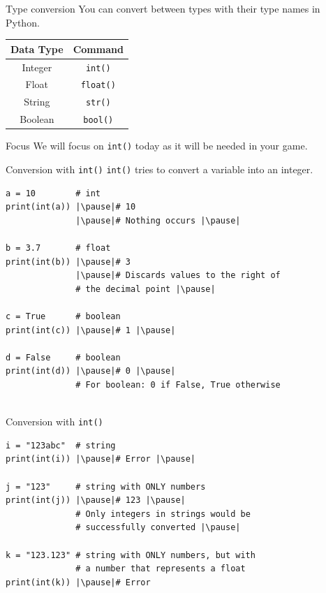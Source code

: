\documentclass[dvipsnames, svgnames, x11names, handout]{beamer}
\begin{document}
\begin{frame}{Type conversion}
You can convert between types with their type names in Python.
\begin{center}
	\begin{tabular}{|c|c|}\hline
		Data Type & Command\\\hline
		Integer & \texttt{int()}\\\hline
		Float & \texttt{float()}\\\hline
		String & \texttt{str()}\\\hline
		Boolean & \texttt{bool()}\\\hline
	\end{tabular}
\end{center}

\begin{block}{Focus}
We will focus on \texttt{int()} today as it will be needed in your game.
\end{block}

\end{frame}

\begin{frame}[fragile]{Conversion with \texttt{int()}}
\texttt{int()} tries to convert a variable into an integer.
\begin{verbatim} 
a = 10        # int
print(int(a)) |\pause|# 10
			  |\pause|# Nothing occurs |\pause|
			  
b = 3.7       # float
print(int(b)) |\pause|# 3
              |\pause|# Discards values to the right of 
              # the decimal point |\pause|
              
c = True      # boolean
print(int(c)) |\pause|# 1 |\pause|

d = False     # boolean
print(int(d)) |\pause|# 0 |\pause|
              # For boolean: 0 if False, True otherwise
              
\end{verbatim}
\end{frame}

\begin{frame}[fragile]{Conversion with \texttt{int()}}
\begin{verbatim}
i = "123abc"  # string
print(int(i)) |\pause|# Error |\pause|

j = "123"     # string with ONLY numbers
print(int(j)) |\pause|# 123 |\pause|
              # Only integers in strings would be 
              # successfully converted |\pause|

k = "123.123" # string with ONLY numbers, but with 
              # a number that represents a float
print(int(k)) |\pause|# Error 
\end{verbatim}
\end{frame}
\end{document}
